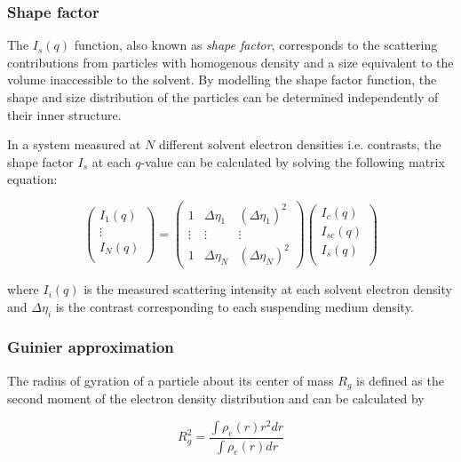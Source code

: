 \subsubsection{Shape factor}
The $I_s(q)$ function, also known as \emph{shape factor}, corresponds to the scattering contributions from particles with homogenous density and a size equivalent to the volume inaccessible to the solvent. By modelling the shape factor function, the shape and size distribution of the particles can be determined independently of their inner structure.

In a system measured at $N$ different solvent electron densities i.e. contrasts, the shape factor $I_s$ at each $q$-value can be calculated by solving the following matrix equation:

\begin{equation}
  \begin{pmatrix}
  I_1(q) \\
  \vdots \\
  I_N(q) \\
 \end{pmatrix}
  = 
 \begin{pmatrix}
  1 & \Delta \eta_1 &  \left( \Delta \eta_1 \right)^2 \\
  \vdots  & \vdots  & \vdots  \\
  1 & \Delta \eta_N &  \left( \Delta \eta_N \right)^2 
 \end{pmatrix}
 \begin{pmatrix}
  I_c(q) \\
  I_{sc}(q) \\
  I_s(q) \\
 \end{pmatrix}
\end{equation}

where $I_i (q)$ is the measured scattering intensity at each solvent electron density and $\Delta \eta _i$ is the contrast corresponding to each suspending medium density.

\subsubsection{Guinier approximation}
\label{sec:TheoryGuinier}

The radius of gyration of a particle about its center of mass $R_g$ is defined as the second moment of the electron density distribution and can be calculated by 

\begin{equation}
        R_g^2 = \frac{\int \rho_e (r) r^2 dr}{\int \rho_e (r)  dr}
\end{equation}

